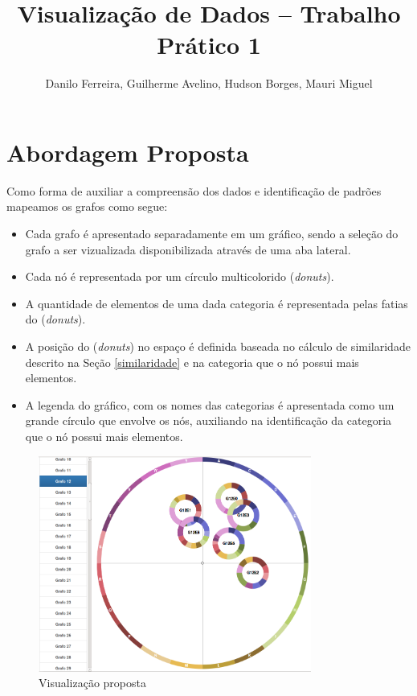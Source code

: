 \documentclass[12pt]{article}
\title{Visualização de Dados -- Trabalho Prático 1}
\author{Danilo Ferreira, Guilherme Avelino, Hudson Borges, Mauri Miguel}
\begin{document}
\maketitle





\section{Abordagem Proposta}

Como forma de auxiliar a compreensão dos dados e identificação de padrões mapeamos os grafos como segue:
\begin{itemize} 
	\item Cada grafo é apresentado separadamente em um gráfico, sendo a seleção do grafo a ser vizualizada disponibilizada através de uma aba lateral.
	\item Cada nó é representada por um círculo multicolorido (\textit{donuts}). 
	\item A quantidade de elementos de uma dada categoria é representada pelas fatias do  (\textit{donuts}).
	\item A posição do (\textit{donuts}) no espaço é definida baseada no cálculo de similaridade descrito na Seção \ref{similaridade} e na categoria que o nó possui mais elementos.
	\item A legenda do gráfico, com os nomes das categorias é apresentada como um grande círculo que envolve os nós, auxiliando na identificação da categoria que o nó possui mais elementos.
\end{itemize}


\begin{figure}[h!]
  \caption{Visualização proposta}
  \centering
  \includegraphics[width=0.8\textwidth]{visualizacao.png}
\end{figure}
\end{document}
